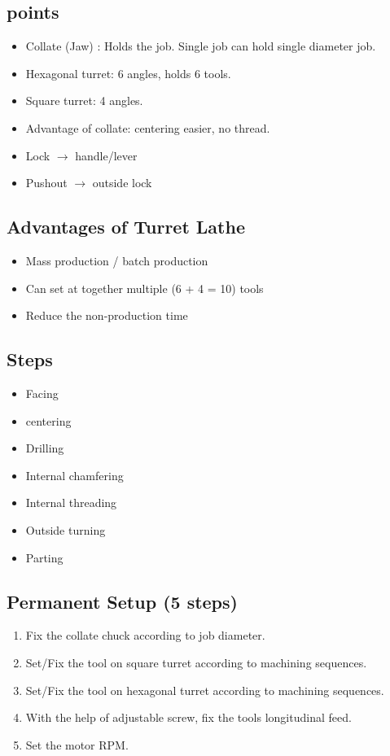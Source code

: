 \documentclass{article}
\begin{document}
\begin{multicols}{2}
\subsection*{points}
\begin{itemize}
  \item Collate (Jaw) : Holds the job. Single job can hold single diameter job. 
  \item Hexagonal turret: 6 angles, holds 6 tools. 
  \item Square turret: 4 angles.
  \item Advantage of collate: centering easier, no thread. 
  \item Lock $\rightarrow$ handle/lever 
  \item Pushout $\rightarrow$ outside lock 
\end{itemize}

\subsection*{Advantages of Turret Lathe}
\begin{itemize}
  \item Mass production / batch production 
  \item Can set at together multiple (6 + 4 = 10) tools 
  \item Reduce the non-production time
\end{itemize}

\subsection*{Steps}
\begin{itemize}
  \item Facing
  \item centering
  \item Drilling
  \item Internal chamfering
  \item Internal threading
  \item Outside turning
  \item Parting 
\end{itemize}

\subsection*{Permanent Setup (5 steps)}
\begin{enumerate}
  \item Fix the collate chuck according to job diameter. 
  \item Set/Fix the tool on square turret according to machining sequences. 
  \item Set/Fix the tool on hexagonal turret according to machining sequences.
  \item With the help of adjustable screw, fix the tools longitudinal feed. 
  \item Set the motor RPM. 
\end{enumerate}


\end{multicols}
\end{document}
